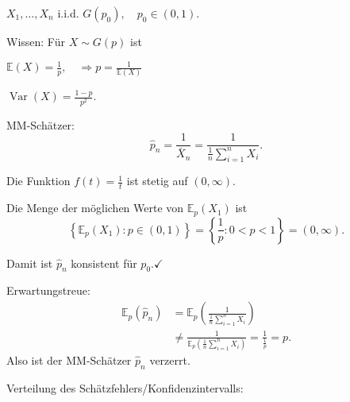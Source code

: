 \documentclass{tstextbook}
\DeclareMathOperator{\Var}{Var}
\newcommand{\E}{\mathbb E}
\begin{document}
\begin{example}
	$ X_1, \ldots, X_n $ i.i.d. $ G(p_0), \quad p_0 \in (0,1) $.
	
	Wissen: Für $ X \sim G(p) $ ist 
	
	$ \E(X) = \frac{1}{p}, \quad \Rightarrow p = \frac{1}{\E(X)} $
	
	$ \Var(X) = \frac{1-p}{p^2} $.
	
	MM-Schätzer: 
	\[
	\hat{p}_n = \frac{1}{\bar{X}_n} = \frac{1}{\frac{1}{n} \sum_{i=1}^{n} X_i}.
	\]
	
	Die Funktion $ f(t) = \frac{1}{t} $ ist stetig auf $ (0,\infty) $. 
	
	Die Menge der möglichen Werte von $ \E_p(X_1) $ ist \[ \left\lbrace \E_p (X_1) \colon p\in (0,1) \right\rbrace = \left\lbrace \frac{1}{p} \colon 0<p<1 \right\rbrace = (0, \infty). \]
	
	Damit ist $ \hat{p}_n $ konsistent für $ p_0 . \checkmark $
	
	Erwartungstreue: 
	\[
	\begin{aligned}
		\E_p(\hat{p}_n)  & = \E_p \left( \frac{1}{\frac{1}{n}\sum_{i=1}^{n}X_i} \right) \\
		& \ne \frac{1}{\E_p\left(\frac{1}{n}\sum_{i=1}^{n}X_i \right) } = \frac{1}{\frac{1}{p}} = p.
	\end{aligned}
	\]
	Also ist der MM-Schätzer $ \hat{p}_n $ verzerrt.
\end{example}

Verteilung des Schätzfehlers/Konfidenzintervalls:
\end{document}
